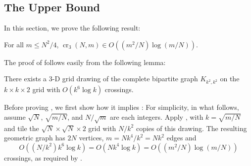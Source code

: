 \documentclass{patmorin}
\newcommand{\n}{N}
\DeclareMathOperator{\crs}{cr}
\begin{document}

\subsection{The Upper Bound}

In this section, we prove the following result:

\begin{thm}
  For all $m\le\n^2/4$, $\crs_3(\n,m) \in O((m^2/\n)\log (m/\n))$.
\end{thm}

The proof of  follows easily from the following
lemma:
\begin{lem}
  There exists a 3-D grid drawing of the complete bipartite graph
  $K_{k^2,k^2}$ on the $k\times k\times 2$ grid with $O(k^6\log k)$
  crossings.
\end{lem}

Before proving , we first show how it implies
: For simplicity, in what follows, assume
$\sqrt{\n}$, $\sqrt{m/\n}$, and $\n/\sqrt{m}$ are each integers.
Apply , with $k=\sqrt{m/\n}$ and tile the
$\sqrt{\n}\times\sqrt{\n}\times 2$ grid with $\n/k^2$ copies of
this drawing. The resulting geometric graph has $2\n$ vertices,
$m=\n k^4/k^2=\n k^2$ edges and
\[ 
   O((\n/k^2)k^6\log k) = O(\n k^4\log k) = O((m^2/\n)\log(m/\n))
\] 
crossings, as required by .
\end{document}
